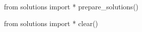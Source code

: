 



\begin{python0}
from solutions import *
prepare_solutions()
\end{python0}

\begin{python0}
from solutions import *
clear()
\end{python0}
